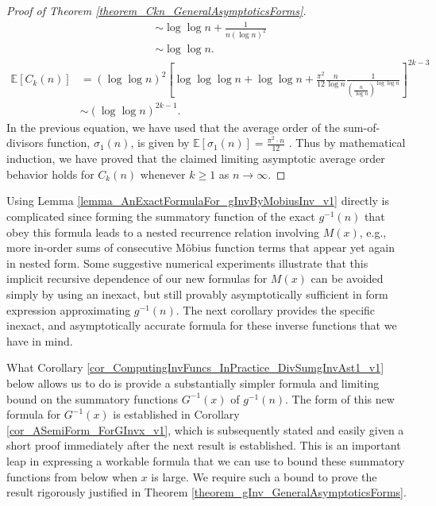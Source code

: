 \documentclass[11pt,reqno,a4letter]{article}
\numberwithin{figure}{section}
\numberwithin{table}{section}
\theoremstyle{plain}
\numberwithin{theorem}{section}
\theoremstyle{definition}
\begin{document}
\begin{proof}[Proof of Theorem \ref{theorem_Ckn_GeneralAsymptoticsForms}]
{\begin{align*}
          & \sim \log\log n + \frac{1}{n (\log n)^2} \\ 
          & \sim \log\log n. 
     \end{align*} 
}
\begin{align*} 
\mathbb{E}[C_k(n)] & = (\log\log n)^2 \left[
     \log\log\log n + \log\log n + \frac{\pi^2}{12} \frac{n}{\log n} \frac{1}{\left( 
     \frac{n}{\log n}\right)^{\log\log n}} 
     \right]^{2k-3} \\ 
     & \sim (\log\log n)^{2k-1}. 
\end{align*} 
In the previous equation, we have used that the average order of the sum-of-divisors function, $\sigma_1(n)$, 
is given by $\mathbb{E}[\sigma_1(n)] = \frac{\pi^2 \cdot n}{12}$ \cite[\S 27.11]{NISTHB}. 
Thus by mathematical induction, we have proved that the claimed limiting asymptotic average order 
behavior holds for $C_k(n)$ whenever $k \geq 1$ as $n \rightarrow \infty$. 
\end{proof} 

Using Lemma \ref{lemma_AnExactFormulaFor_gInvByMobiusInv_v1} directly is complicated since 
forming the summatory function of the exact $g^{-1}(n)$ that obey this formula leads to 
a nested recurrence relation involving $M(x)$, e.g., 
more in-order sums of consecutive M\"obius function terms that appear yet again in nested form. 
Some suggestive numerical experiments illustrate that this implicit recursive 
dependence of our new formulas for $M(x)$ can be avoided simply by using an inexact, but still 
provably asymptotically sufficient in form expression approximating $g^{-1}(n)$. 
The next corollary provides the specific 
inexact, and asymptotically accurate formula for these inverse functions that we have in mind. 

What Corollary \ref{cor_ComputingInvFuncs_InPractice_DivSumgInvAst1_v1} below 
allows us to do is 
provide a substantially simpler formula and limiting bound on the summatory functions 
$G^{-1}(x)$ of $g^{-1}(n)$. The form of this new formula for $G^{-1}(x)$ is 
established in Corollary \ref{cor_ASemiForm_ForGInvx_v1}, which is subsequently stated and 
easily given a short proof immediately after the next result is established. 
This is an important leap in expressing a workable formula that we can use to bound these 
summatory functions from below when $x$ is large. We require such a bound to prove the result 
rigorously justified in Theorem \ref{theorem_gInv_GeneralAsymptoticsForms}. 
\end{document}
